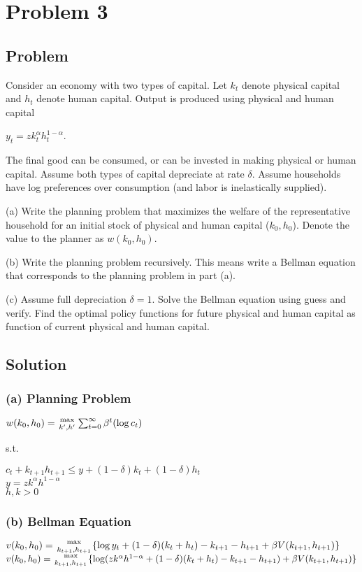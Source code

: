\documentclass[10pt, a4paper]{article}
\begin{document}
  \section*{Problem 3}
  \subsection*{Problem}
    Consider an economy with two types of capital. Let $k_t$ denote physical capital and $h_t$ denote human capital. Output is produced using physical and human capital
    \begin{center}
      $y_t=zk_t^{\alpha}h_t^{1-\alpha}$.
    \end{center}
    The final good can be consumed, or can be invested in making physical or human capital. Assume both types of capital depreciate at rate $\delta$. Assume households have log preferences over consumption (and labor is inelastically supplied).

    (a) Write the planning problem that maximizes the welfare of the representative household for an initial stock of physical and human capital ($k_0,h_0$). Denote the value to the planner as $w(k_0,h_0)$.

    (b) Write the planning problem recursively. This means write a Bellman equation that corresponds to the planning problem in part (a).

    (c) Assume full depreciation $\delta=1$. Solve the Bellman equation using guess and verify. Find the optimal policy functions for future physical and human capital as function of current physical and human capital.
  \subsection*{Solution}
    \subsubsection*{(a) Planning Problem}
    \begin{center}
      $w(k_0,h_0)={\max\atop{k',h'}}\sum^{\infty}_{t=0}\beta^t(\log c_t)$ \\
    \end{center}
    s.t.
    \begin{center}
      $c_t+k_{t+1}h_{t+1}\leq y+(1-\delta)k_t+(1-\delta)h_t$ \\
      $y=zk^{\alpha}h^{1-\alpha}$ \\
      $h,k>0$
    \end{center}
    \subsubsection*{(b) Bellman Equation}
    \begin{center}
      $v(k_0,h_0) = {\max\atop{k_{t+1},h_{t+1}}}\{\log y_t+(1-\delta)(k_t+h_t)-k_{t+1}-h_{t+1}+\beta V(k_{t+1},h_{t+1})\}$ \\
      $v(k_0,h_0) = {\max\atop{k_{t+1},h_{t+1}}}\{\log(zk^{\alpha}h^{1-\alpha}+(1-\delta)(k_t+h_t)-k_{t+1}-h_{t+1})+\beta V(k_{t+1},h_{t+1})\}$
    \end{center}
\end{document}
